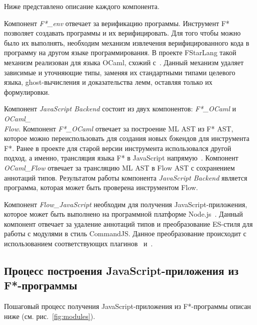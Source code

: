 \documentclass[12pt]{matmex-diploma}
\begin{document}
Ниже представлено описание каждого компонента.

Компонент \textit{F*\_env} отвечает за верификацию программы. Инструмент F* позволяет создавать программы и их верифицировать. Для того чтобы можно было их выполнять, необходим механизм извлечения верифицированного кода в программу на другом языке программирования. В проекте FStarLang такой механизм реализован для языка OCaml, схожий с~\cite{Letouzey2008}. Данный механизм удаляет зависимые и уточняющие типы, заменяя их стандартными типами целевого языка, ghost-вычисления и доказательства лемм, оставляя только их формулировки.

Компонент \textit{JavaScript Backend} состоит из двух компонентов: \textit{F*\_OCaml} и \textit{OCaml\_ \\Flow}. Компонент \textit{F*\_OCaml} отвечает за построение ML AST из F* AST, которое можно переиспользовать для создания новых бэкендов для инструмента F*. Ранее в проекте для старой версии инструмента использовался другой подход, а именно, трансляция языка F* в JavaScript напрямую~\cite{fully_abstract_js}. Компонент \textit{OCaml\_Flow} отвечает за трансляцию ML AST в Flow AST с сохранением аннотаций типов. Результатом работы компонента \textit{JavaScript Backend} является программа, которая может быть проверена инструментом Flow.

Компонент \textit{Flow\_JavaScript} необходим для получения JavaScript-приложения, которое может быть выполнено на программной платформе Node.js~\cite{node_js}. Данный компонент отвечает за удаление аннотаций типов и преобразование ES-стиля для работы с модулями в стиль CommandJS. Данное преобразование происходит с использованием соответствующих плагинов~\cite{flow_plugin} и~\cite{module_plugin}.

\subsection{Процесс построения JavaScript-приложения из F*-программы}

Пошаговый процесс получения JavaScript-приложения из F*-программы описан ниже (см. рис.~\ref{fig:modules}).
\end{document}
